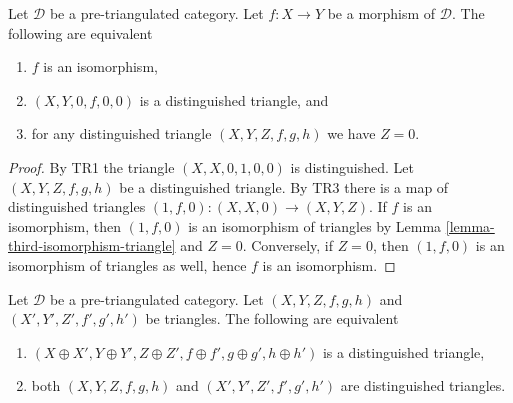 \begin{lemma}
\label{lemma-third-object-zero}
Let $\mathcal{D}$ be a pre-triangulated category.
Let $f : X \to Y$ be a morphism of $\mathcal{D}$.
The following are equivalent
\begin{enumerate}
\item $f$ is an isomorphism,
\item $(X, Y, 0, f, 0, 0)$ is a distinguished triangle, and
\item for any distinguished triangle $(X, Y, Z, f, g, h)$ we have $Z = 0$.
\end{enumerate}
\end{lemma}

\begin{proof}
By TR1 the triangle $(X, X, 0, 1, 0, 0)$ is distinguished.
Let $(X, Y, Z, f, g, h)$ be a distinguished triangle.
By TR3 there is a map of distinguished triangles
$(1, f, 0) : (X, X, 0) \to (X, Y, Z)$.
If $f$ is an isomorphism, then $(1, f, 0)$ is an isomorphism
of triangles by Lemma \ref{lemma-third-isomorphism-triangle}
and $Z = 0$. Conversely, if $Z = 0$, then $(1, f, 0)$ is an
isomorphism of triangles as well, hence $f$ is an isomorphism.
\end{proof}

\begin{lemma}
\label{lemma-direct-sum-triangles}
Let $\mathcal{D}$ be a pre-triangulated category.
Let $(X, Y, Z, f, g, h)$ and $(X', Y', Z', f', g', h')$ be triangles.
The following are equivalent
\begin{enumerate}
\item $(X \oplus X', Y \oplus Y', Z \oplus Z',
f \oplus f', g \oplus g', h \oplus h')$
is a distinguished triangle,
\item both $(X, Y, Z, f, g, h)$ and $(X', Y', Z', f', g', h')$ are
distinguished triangles.
\end{enumerate}
\end{lemma}

